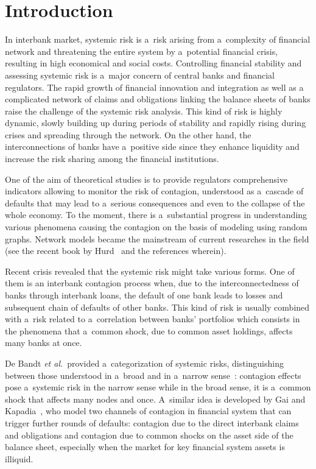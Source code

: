       \begin{multicols}{2}

                  \label{st\stat}




\section{Introduction} 

\noindent
In interbank market, systemic risk is a~risk arising from a~complexity of 
financial network and threatening the entire system by a~potential financial 
crisis,
resulting in high economical and social costs.  Controlling financial stability 
and assessing systemic  risk is a~major concern of central banks and financial 
regulators.
The rapid growth of financial innovation and integration as well as a~
complicated  network of claims and obligations  linking the balance sheets of 
banks raise the challenge of the systemic risk analysis.
This kind of risk is highly dynamic, slowly building up    during periods of 
stability and rapidly rising during crises and spreading through the network.  
On the other hand, the interconnections of banks have a~positive side since they   
enhance  liquidity and increase the risk sharing among the financial 
institutions. 

One of the aim of theoretical studies is to provide regulators comprehensive 
indicators allowing  to monitor  the risk of contagion, understood as  a~cascade 
of defaults that may lead to a~serious consequences and even to the collapse of 
the whole economy.  To the moment, there is a~substantial progress in 
understanding various phenomena  causing the contagion
 on the basis of modeling using random graphs.  Network models became the 
mainstream of current researches in the field (see the recent book by 
Hurd~\cite{Hurd}  and the references wherein).

Recent crisis revealed that the systemic risk might take various forms. One of 
them is an interbank contagion process when, due to the interconnectedness of 
banks through interbank loans, the default of one bank leads to losses and 
subsequent chain of  defaults of other banks. This kind of risk is usually 
combined with a~risk  related to a~correlation  between banks' portfolios which
consists in the phenomena that a~common shock, due to common asset holdings, 
affects many banks at once.

De Bandt {\it et al.}\ provided a~categorization of systemic 
risks, distinguishing between those understood in  a~broad and in a~narrow 
sense~\cite{Bandt}: contagion effects pose a~systemic risk in the narrow sense while in the 
broad sense, it is a~common shock that affects many nodes and once.
A~similar idea is developed  by Gai and Kapadia~\cite{GK},  who model 
two channels of contagion in financial system that can trigger further rounds of 
defaults: contagion due to the direct interbank claims and obligations and 
contagion due to common shocks on the asset side of the balance sheet, 
especially when the market for key financial system assets is illiquid.


\end{multicols}
